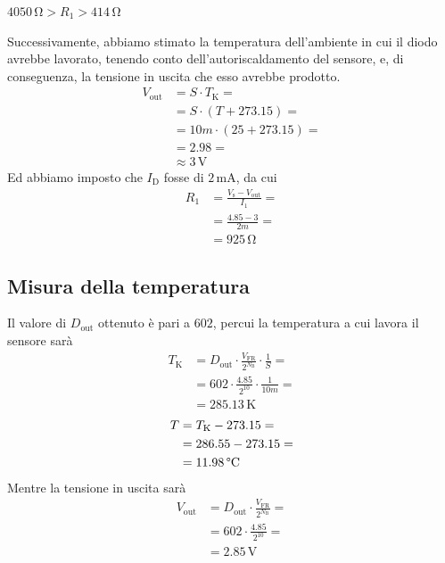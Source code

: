 \documentclass[a4paper]{article}
\begin{document}
			\begin{center}
				$ 4050 \, \mathrm{\Omega} > R_{1} > 414 \, \mathrm{\Omega} $
			\end{center}
			Successivamente, abbiamo stimato la temperatura dell'ambiente in cui il diodo avrebbe lavorato, tenendo conto dell'autoriscaldamento del sensore, e, di conseguenza, la tensione in uscita che esso avrebbe prodotto.
			\begin{equation*}
				\begin{split}
					V_{\mathrm{out}} &= S \cdot T_{\mathrm{K}} = \\
									 &= S \cdot (T + 273.15) = \\
									 &= 10m \cdot (25 + 273.15) = \\
									 &= 2.98 = \\
									 &\approx 3 \, \mathrm{V}
				\end{split}
			\end{equation*}
			Ed abbiamo imposto che $ I_{\mathrm{D}} $ fosse di $ 2 \, \mathrm{mA} $, da cui
			\begin{equation*}
				\begin{split}
					R_{1} &= \frac{V_{\mathrm{s}} - V_{\mathrm{out}}}{I_{1}} = \\
						  &= \frac{4.85 - 3}{2m} = \\
						  &= 925 \, \mathrm{\Omega}
				\end{split}
			\end{equation*}
		\subsection{Misura della temperatura} 
			Il valore di $ D_{\mathrm{out}} $ ottenuto è pari a $ 602 $, percui la temperatura a cui lavora il sensore sarà
			\begin{equation*}
				\begin{split}
					T_{\mathrm{K}} &= D_{\mathrm{out}} \cdot \frac{V_{\mathrm{FR}}}{2^{N_{\mathrm{B}}}} \cdot \frac{1}{S} = \\
								   &= 602 \cdot \frac{4.85}{2^{10}} \cdot \frac{1}{10m} = \\
								   &= 285.13 \, \mathrm{K}
				\end{split}
			\end{equation*}
			\begin{equation*}
				\begin{split}
					T &= T_{\mathrm{K}} - 273.15 = \\
					  &= 286.55 - 273.15 = \\
					  &= 11.98 \, \mathrm{\text{\textdegree} C}
				\end{split}
			\end{equation*}
			Mentre la tensione in uscita sarà
			\begin{equation*}
				\begin{split}
					V_{\mathrm{out}} &= D_{\mathrm{out}} \cdot \frac{V_{\mathrm{FR}}}{2^{N_{\mathrm{B}}}} = \\
									 &= 602 \cdot \frac{4.85}{2^{10}} = \\
									 &= 2.85 \, \mathrm{V}
				\end{split}
			\end{equation*}
\end{document}
